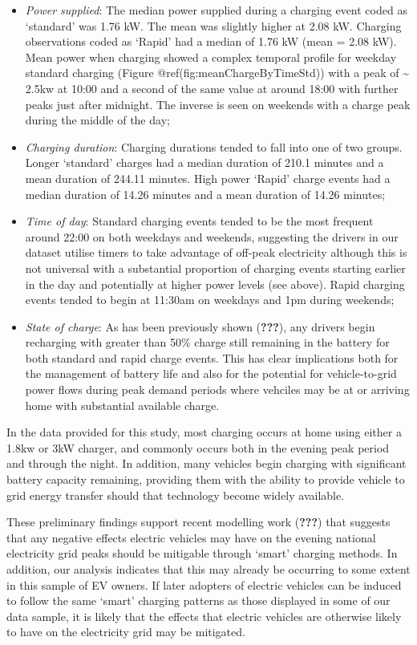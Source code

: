 \documentclass[]{article}
\providecommand{\tightlist}{%
  \setlength{\itemsep}{0pt}\setlength{\parskip}{0pt}}
\begin{document}
\begin{itemize}
\tightlist
\item
  \emph{Power supplied}: The median power supplied during a charging event coded as `standard' was 1.76 kW. The mean was slightly higher at 2.08 kW. Charging observations coded as `Rapid' had a median of 1.76 kW (mean = 2.08 kW). Mean power when charging showed a complex temporal profile for weekday standard charging (Figure @ref(fig:meanChargeByTimeStd)) with a peak of \textasciitilde{} 2.5kw at 10:00 and a second of the same value at around 18:00 with further peaks just after midnight. The inverse is seen on weekends with a charge peak during the middle of the day;
\item
  \emph{Charging duration}: Charging durations tended to fall into one of two groups. Longer `standard' charges had a median duration of 210.1 minutes and a mean duration of 244.11 minutes. High power `Rapid' charge events had a median duration of 14.26 minutes and a mean duration of 14.26 minutes;
\item
  \emph{Time of day}: Standard charging events tended to be the most frequent around 22:00 on both weekdays and weekends, suggesting the drivers in our dataset utilise timers to take advantage of off-peak electricity although this is not universal with a substantial proportion of charging events starting earlier in the day and potentially at higher power levels (see above). Rapid charging events tended to begin at 11:30am on weekdays and 1pm during weekends;
\item
  \emph{State of charge}: As has been previously shown ({\textbf{???}}), any drivers begin recharging with greater than 50\% charge still remaining in the battery for both standard and rapid charge events. This has clear implications both for the management of battery life and also for the potential for vehicle-to-grid power flows during peak demand periods where vehciles may be at or arriving home with substantial available charge.
\end{itemize}

In the data provided for this study, most charging occurs at home using either a 1.8kw or 3kW charger, and commonly occurs both in the evening peak period and through the night. In addition, many vehicles begin charging with significant battery capacity remaining, providing them with the ability to provide vehicle to grid energy transfer should that technology become widely available.

These preliminary findings support recent modelling work ({\textbf{???}}) that suggests that any negative effects electric vehicles may have on the evening national electricity grid peaks should be mitigable through `smart' charging methods. In addition, our analysis indicates that this may already be occurring to some extent in this sample of EV owners. If later adopters of electric vehicles can be induced to follow the same `smart' charging patterns as those displayed in some of our data sample, it is likely that the effects that electric vehicles are otherwise likely to have on the electricity grid may be mitigated.
\end{document}
